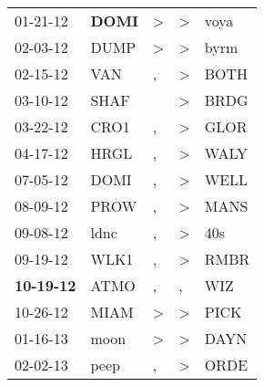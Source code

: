 \begin{supertabular}{p{0.07\textwidth}p{0.06\textwidth}p{0.02\textwidth}p{0.02\textwidth}p{0.06\textwidth}}
          01-21-12\textsuperscript{} &  \textbf{DOMI\textsuperscript{}} &     \textgreater &     \textgreater &           voya\textsuperscript{} \\
          02-03-12\textsuperscript{} &           DUMP\textsuperscript{} &     \textgreater &     \textgreater &           byrm\textsuperscript{} \\
          02-15-12\textsuperscript{} &            VAN\textsuperscript{} &                , &     \textgreater &           BOTH\textsuperscript{} \\
          03-10-12\textsuperscript{} &           SHAF\textsuperscript{} &                  &     \textgreater &           BRDG\textsuperscript{} \\
          03-22-12\textsuperscript{} &           CRO1\textsuperscript{} &                , &     \textgreater &           GLOR\textsuperscript{} \\
          04-17-12\textsuperscript{} &           HRGL\textsuperscript{} &                , &     \textgreater &           WALY\textsuperscript{} \\
          07-05-12\textsuperscript{} &           DOMI\textsuperscript{} &                , &     \textgreater &           WELL\textsuperscript{} \\
          08-09-12\textsuperscript{} &           PROW\textsuperscript{} &                , &     \textgreater &           MANS\textsuperscript{} \\
          09-08-12\textsuperscript{} &           ldnc\textsuperscript{} &                , &     \textgreater &            40s\textsuperscript{} \\
          09-19-12\textsuperscript{} &           WLK1\textsuperscript{} &                , &     \textgreater &           RMBR\textsuperscript{} \\
 \textbf{10-19-12\textsuperscript{}} &           ATMO\textsuperscript{} &                , &                , &            WIZ\textsuperscript{} \\
          10-26-12\textsuperscript{} &           MIAM\textsuperscript{} &     \textgreater &     \textgreater &           PICK\textsuperscript{} \\
          01-16-13\textsuperscript{} &           moon\textsuperscript{} &     \textgreater &     \textgreater &           DAYN\textsuperscript{} \\
          02-02-13\textsuperscript{} &           peep\textsuperscript{} &                , &     \textgreater &           ORDE\textsuperscript{} \\

\end{supertabular}
